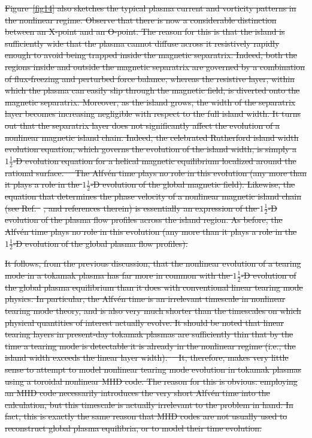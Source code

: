 \documentclass[12pt,prb,aps]{revtex4-1}
\providecommand{\DIFdel}[1]{{\protect\color{red}\sout{#1}}}                      %
\begin{document}
\DIFdel{Figure~\ref{fig14} also sketches the
typical plasma current and vorticity patterns in the nonlinear regime. Observe that there is now a considerable distinction between an X-point and an O-point. The reason for this is that the island is sufficiently wide that the plasma cannot diffuse across it resistively rapidly enough to
avoid being trapped inside the magnetic separatrix. Indeed, both the regions inside and outside the magnetic separatrix
are governed by a combination of flux-freezing and perturbed force balance, whereas the resistive
layer, within which the plasma can easily slip through the magnetic field,  is diverted onto the magnetic separatrix. Moreover, as
the island grows, the width of the separatrix layer becomes
increasing negligible with respect to the full island width. It
turns out that the separatrix layer does not significantly affect the evolution of a nonlinear magnetic island chain. Indeed,
the celebrated Rutherford island width evolution equation,
which governs the evolution of the island width, is simply a
$1\tfrac{1}{2}$-D evolution equation for a helical magnetic
equilibrium localized around the rational surface.\mbox{%
\cite{ruth}
}\hspace{0pt}%
The Alfv\'{e}n time plays no role in this evolution (any more
than it plays a role in the $1\tfrac{1}{2}$-D evolution of
the global magnetic field). Likewise, the equation that
determines the phase velocity of a nonlinear magnetic island chain (see Ref.~}%
\DIFdel{, and references therein) is essentially an
expression of the $1\tfrac{1}{2}$-D evolution of the plasma
flow profiles across the island region. As before, the  Alfv\'{e}n time plays no role in this evolution (any more
than it plays a role in the $1\tfrac{1}{2}$-D evolution of
the global plasma flow profiles). 
}%

\DIFdel{It follows, from the previous discussion, that the nonlinear evolution of a tearing mode in a tokamak plasma has far more in common with the $1\tfrac{1}{2}$-D
evolution of the global plasma equilibrium than it does with
conventional linear tearing mode physics. In particular, the Alfv\'{e}n time is
an irrelevant timescale in nonlinear tearing mode theory, and
is also  very much shorter than the timescales on which
physical quantities of interest actually evolve. It should be noted that linear tearing layers in present-day tokamak plasmas are sufficiently thin that by the time a tearing mode is detectable it is already in the nonlinear regime (i.e., the island width exceeds the linear layer width).\mbox{%
\cite{wesson} }\hspace{0pt}%
It, therefore, makes very little sense to
attempt to model nonlinear tearing mode evolution in tokamak plasmas using a toroidal nonlinear MHD code. The reason for this is obvious: employing  an MHD code necessarily introduces the very short Alfv\'{e}n time into the calculation,
but this timescale is actually irrelevant to the problem in hand. In fact, this is exactly the same reason that MHD codes are not usually used to reconstruct global plasma equilibria, or to model their time evolution.
}%
\end{document}
